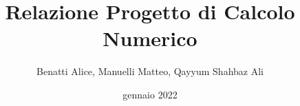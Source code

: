 \documentclass{article}
\title{\textbf{Relazione Progetto di Calcolo Numerico}}
\author{Benatti Alice, Manuelli Matteo, Qayyum Shahbaz Ali}
\date{gennaio 2022}
\begin{document}
\maketitle

\tableofcontents

\newpage
\begin{comment}
Relazione

1. Riportare e commentare i risultati ottenuti nei punti 2. 3. (e 4.) 
su un immagine del set creato e su altre due immagini in bianco e nero 
(fotografiche/mediche/astronomiche)
2. Riportare delle tabelle con le misure di PSNR e MSE ottenute al 
variare dei parametri (dimensione kernel, valore di sigma, la 
deviazione standard del rumore, il parametro di regolarizzazione). 
3. Calcolare sull’intero set di immagini medie e deviazione standard 
delle metriche per alcuni valori fissati dei parametri.  
4. Analizzare su 2 esecuzioni le proprietà dei metodi numerici 
utilizzati (gradiente coniugato e gradiente) in termini di numero di 
iterazioni, andamento dell’errore, della funzione obiettivo, norma del 
gradiente. 
\end{comment}



\end{document}
